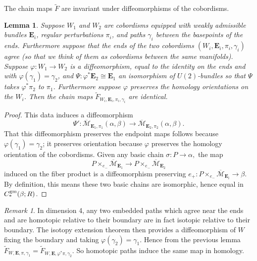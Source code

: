 \documentclass[10pt,a4paper]{amsart}
\newtheorem{lemma}[theorem]{Lemma}
\theoremstyle{definition}
\theoremstyle{remark}
\newtheorem{remark}[theorem]{Remark}
\numberwithin{figure}{qchap}
\begin{document}
The chain maps $\widetilde F$ are invariant under diffeomorphisms of the cobordisms.

\begin{lemma}\label{DiffInvar}Suppose $W_1$ and $W_2$ are cobordisms equipped with weakly admissible bundles $\mathbf{E}_i$, regular perturbations $\pi_i$, and paths $\gamma_i$ between the basepoints of the ends. Furthermore suppose that the ends of the two cobordisms $(W_i, \mathbf{E}_i, \pi_i,\gamma_i)$ agree (so that we think of them as cobordisms between the same manifolds). Suppose $\varphi: W_1 \to W_2$ is a diffeomorphism, equal to the identity on the ends and with $\varphi(\gamma_1) = \gamma_2$, and $\Psi: \varphi^*\mathbf{E}_2 \cong \mathbf{E}_1$ an isomorphism of $U(2)$-bundles so that $\Psi$ takes $\varphi^*\pi_2$ to $\pi_1$. Furthermore suppose $\varphi$ preserves the homology orientations on the $W_i$. Then the chain maps $\widetilde F_{W_i, \mathbf{E}_i, \pi_i, \gamma_i}$ are identical.
\end{lemma}

\begin{proof}This data induces a diffeomorphism $$\Psi': \overline{\mathcal M}_{\mathbf{E}_1,\pi_1}(\alpha, \beta) \to \overline{\mathcal M}_{\mathbf{E}_2,\pi_2}(\alpha,\beta).$$ That this diffeomorphism preserves the endpoint maps follows because $\varphi(\gamma_1) = \gamma_2$; it preserves orientation because $\varphi$ preserves the homology orientation of the cobordisms. Given any basic chain $\sigma: P \to \alpha,$ the map $$P \times_{e_-} \overline{\mathcal M}_{\mathbf{E}_1} \to P \times_{e_-} \overline{\mathcal M}_{\mathbf{E}_2}$$ induced on the fiber product is a diffeomorphism preserving $e_+: P \times_{e_-} \overline{\mathcal M}_{\mathbf{E}_i} \to \beta$. By definition, this means these two basic chains are isomorphic, hence equal in $C_*^{\textup{gm}}(\beta;R)$.
\end{proof}

\begin{remark}In dimension 4, any two embedded paths which agree near the ends and are homotopic relative to their boundary are in fact isotopic relative to their boundary. The isotopy extension theorem then provides a diffeomorphism of $W$ fixing the boundary and taking $\varphi(\gamma_2) = \gamma_1$. Hence from the previous lemma $\widetilde F_{W, \mathbf{E}, \pi, \gamma_1} = \widetilde F_{W, \mathbf{E}, \varphi^*\pi, \gamma_2}$. So homotopic paths induce the same map in homology.
\end{remark}
\end{document}
